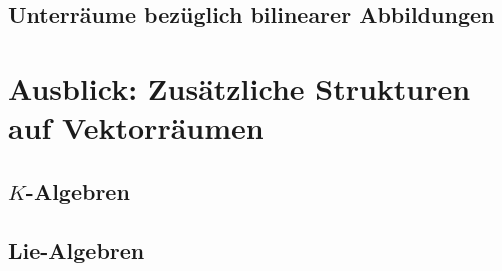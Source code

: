 \subsection{Unterräume bezüglich bilinearer Abbildungen}





\section{Ausblick: Zusätzliche Strukturen auf Vektorräumen}


\subsection{\texorpdfstring{$K$}{K}-Algebren}


\subsection{Lie-Algebren}






